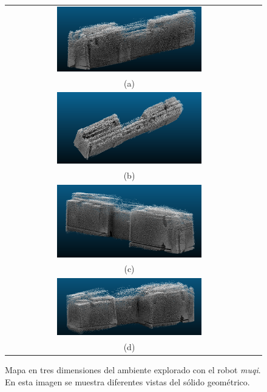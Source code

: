 \begin{figure}%
    \centering
    \begin{tabular}{cc}
      \includegraphics[width=0.60\textwidth]{images/3DSotano1.png}\\
      (a)\\
      \includegraphics[width=0.60\textwidth]{images/3DSotano2.png}\\
      (b)\\
      \includegraphics[width=0.60\textwidth]{images/3DSotano3.png}\\
      (c)\\
      \includegraphics[width=0.60\textwidth]{images/3DSotano4.png}\\
      (d)
    \end{tabular}
  \captionsetup{font=footnotesize}
    \caption{\label{fig:Sotano3D}Mapa en tres dimensiones del ambiente
    explorado con el robot \textit{muqi}. En esta imagen se muestra 
    diferentes vistas del sólido geométrico.}
\end{figure} 

